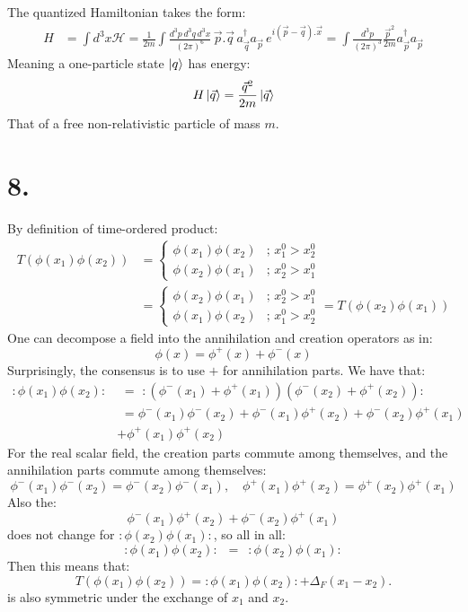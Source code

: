 \documentclass{article}
\newcommand{\asp}{a_{\vec{p}}}
\newcommand{\adp}{a_{\vec{p}}^\dagger}
\newcommand{\adq}{a_{\vec{q}}^\dagger}
\newcommand{\vecx}{\vec{x}}
\newcommand{\vecp}{\vec{p}}
\newcommand{\vecq}{\vec{q}}
\begin{document}
The quantized Hamiltonian takes the form:
\begin{equation}
    \begin{split}
        H &=\int d^3x \mathcal{H} =  \frac{1}{2m}\int \frac{d^3p\,d^3q\,d^3x}{(2\pi)^6}\,\vecp.\vecq\, \adq\asp\, e^{i(\vecp-\vecq).\vecx} = \int \frac{d^3p}{(2\pi)^3}\frac{\vecp^2}{2m}\adp\asp
    \end{split}
\end{equation}
Meaning a one-particle state $\ket{q}$ has energy:
$$
H\ket{\vecq}=\frac{\vecq^2}{2m}\ket{\vecq}
$$
That of a free non-relativistic particle of mass $m$.


\section*{8.}
By definition of time-ordered product:
\begin{equation}
\begin{split}
    T\left( \phi(x_1)\phi(x_2)\right)&=\begin{cases}
        \phi(x_1)\phi(x_2) & ; \, x_1^0 > x_2^0 \\
        \phi(x_2)\phi(x_1) &; \, x_2^0 > x_1^0
    \end{cases} \\
    & = \begin{cases}
        \phi(x_2)\phi(x_1) & ; \, x_2^0 > x_1^0 \\
        \phi(x_1)\phi(x_2) &; \, x_1^0 > x_2^0
    \end{cases} =T\left( \phi(x_2)\phi(x_1)\right)
    \end{split}
\end{equation}
One can decompose a field into the annihilation and creation operators as in:
$$
\phi(x) = \phi^+(x)+\phi^-(x)
$$
Surprisingly, the consensus is to use $+$ for annihilation parts. We have that:
\begin{equation}
\begin{split}
    :\phi(x_1)\phi(x_2):& \,\,= \,\,:\left( \phi^-(x_1) + \phi^+(x_1)\right) \left( \phi^-(x_2) + \phi^+(x_2)\right):\\ & \,\,=\phi^-(x_1)\phi^-(x_2)+\phi^-(x_1)\phi^+(x_2)+\phi^-(x_2)\phi^+(x_1) \\ &+ \phi^+(x_1)\phi^+(x_2)
    \end{split}
\end{equation}
For the real scalar field, the creation parts commute among themselves, and the annihilation parts commute among themselves:
$$
\phi^-(x_1)\phi^-(x_2)=\phi^-(x_2)\phi^-(x_1),\quad \phi^+(x_1)\phi^+(x_2)=\phi^+(x_2)\phi^+(x_1)
$$
Also the:
$$
\phi^-(x_1)\phi^+(x_2)+\phi^-(x_2)\phi^+(x_1)
$$
does not change for $:\phi(x_2)\phi(x_1):$, so all in all:
\begin{equation}
    :\phi(x_1)\phi(x_2):\,\,\,=\,\,\,:\phi(x_2)\phi(x_1):
\end{equation}
Then this means that:
\begin{equation}
T\left(\phi(x_1)\phi(x_2)\right)
=
:\phi(x_1)\phi(x_2):
+
\Delta_F(x_1-x_2).
\end{equation}
is also symmetric under the exchange of $x_1$ and $x_2$.
\end{document}
